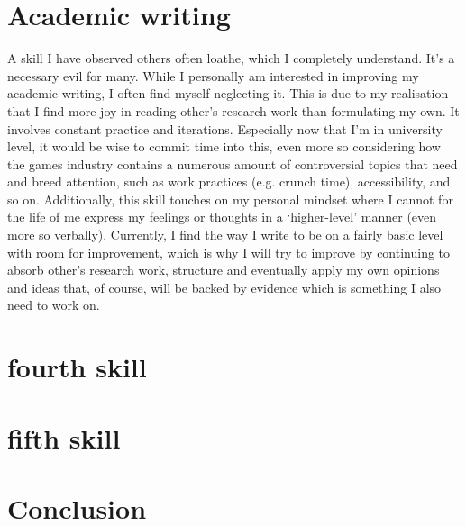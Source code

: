 \documentclass{scrartcl}
\begin{document}
\section{Academic writing}
A skill I have observed others often loathe, which I completely understand. It's a necessary evil for many. While I personally am interested in improving my academic writing, I often find myself neglecting it. This is due to my realisation that I find more joy in reading other's research work than formulating my own. It involves constant practice and iterations. Especially now that I'm in university level, it would be wise to commit time into this, even more so considering how the games industry contains a numerous amount of controversial topics that need and breed attention, such as work practices (e.g. crunch time), accessibility, and so on. Additionally, this skill touches on my personal mindset where I cannot for the life of me express my feelings or thoughts in a `higher-level' manner (even more so verbally). Currently, I find the way I write to be on a fairly basic level with room for improvement, which is why I will try to improve by continuing to absorb other's research work, structure and eventually apply my own opinions and ideas that, of course, will be backed by evidence which is something I also need to work on. 

\section{fourth skill}


\section{fifth skill}


\section{Conclusion}
\end{document}
